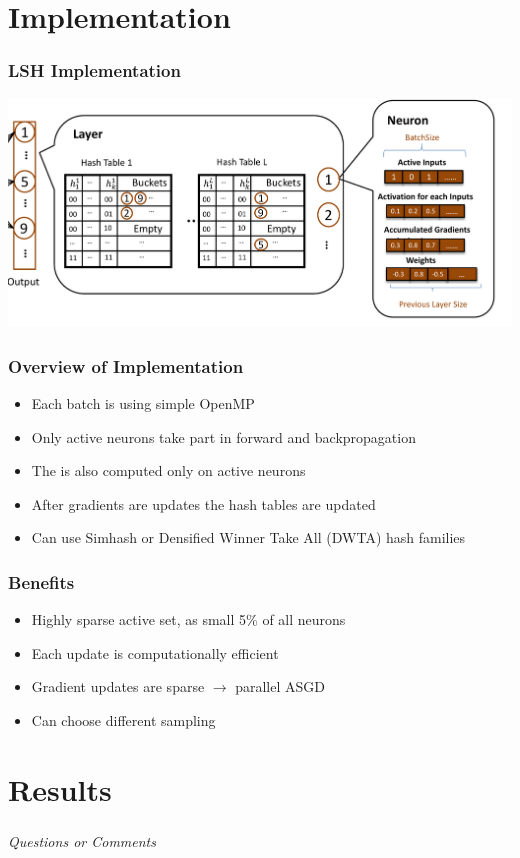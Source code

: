\documentclass{beamer}
\begin{document}
\section{Implementation}

\begin{frame}
    \frametitle{LSH Implementation}

    \centering
    \includegraphics[width=\textwidth]{images/SLIDE.png}
    

\end{frame}

\begin{frame}
    \frametitle{Overview of Implementation}
    \begin{itemize}
        \item Each batch is  using simple OpenMP
        \item Only active neurons take part in forward and backpropagation
        \item The  is also computed only on active neurons
        \item After gradients are updates the hash tables are updated
        \item Can use Simhash or Densified Winner Take All (DWTA) hash families
    \end{itemize}

\end{frame}

\begin{frame}
    \frametitle{Benefits}
    \begin{itemize}
        \item Highly sparse active set, as small 5\% of all neurons
        \item Each update is computationally efficient
        \item Gradient updates are sparse $\rightarrow$ parallel ASGD
        \item Can choose different sampling  
    \end{itemize}
    

\end{frame}
\section{Results}

\begin{frame}
    \frametitle{}

    \centering \Large
    \emph{Questions or Comments}

\end{frame}



\end{document}
